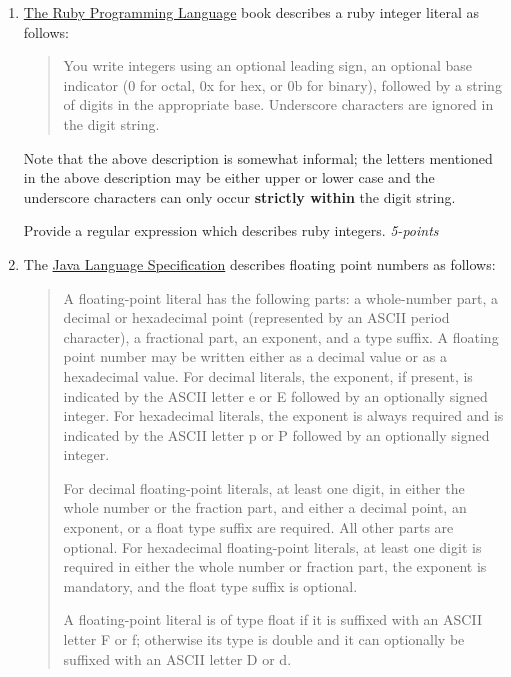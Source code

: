 \documentclass[12pt]{article}
\begin{document}
\begin{enumerate}

\item \href{http://ruby-doc.com/docs/ProgrammingRuby/}{The Ruby
  Programming Language} book describes a ruby integer literal as follows:

  \begin{quote}
    You write integers using an optional leading sign, an optional base indicator (0 for octal, 0x for hex, or 0b for binary), followed by a string of digits in the appropriate base. Underscore characters are ignored in the digit string. 
  \end{quote}

  Note that the above description is somewhat informal; the letters
  mentioned in the above description may be either upper or lower
  case and the underscore characters can only occur \textbf{strictly within}
  the digit string.

  Provide a regular expression which describes ruby integers. \hfill\textit{5-points}

\item The \href{https://docs.oracle.com/javase/specs/jls/se6/html/lexical.html#3.10.2}{Java Language Specification} describes floating point numbers as
  follows:

  \begin{quote}

    A floating-point literal has the following parts: a whole-number
    part, a decimal or hexadecimal point (represented by an ASCII
    period character), a fractional part, an exponent, and a type
    suffix. A floating point number may be written either as a decimal
    value or as a hexadecimal value. For decimal literals, the
    exponent, if present, is indicated by the ASCII letter e or E
    followed by an optionally signed integer. For hexadecimal
    literals, the exponent is always required and is indicated by the
    ASCII letter p or P followed by an optionally signed integer.

    For decimal floating-point literals, at least one digit, in either
    the whole number or the fraction part, and either a decimal point,
    an exponent, or a float type suffix are required. All other parts
    are optional. For hexadecimal floating-point literals, at least
    one digit is required in either the whole number or fraction part,
    the exponent is mandatory, and the float type suffix is optional.

    A floating-point literal is of type float if it is suffixed with
    an ASCII letter F or f; otherwise its type is double and it can
    optionally be suffixed with an ASCII letter D or d.


\end{quote}
\end{enumerate}
\end{document}

